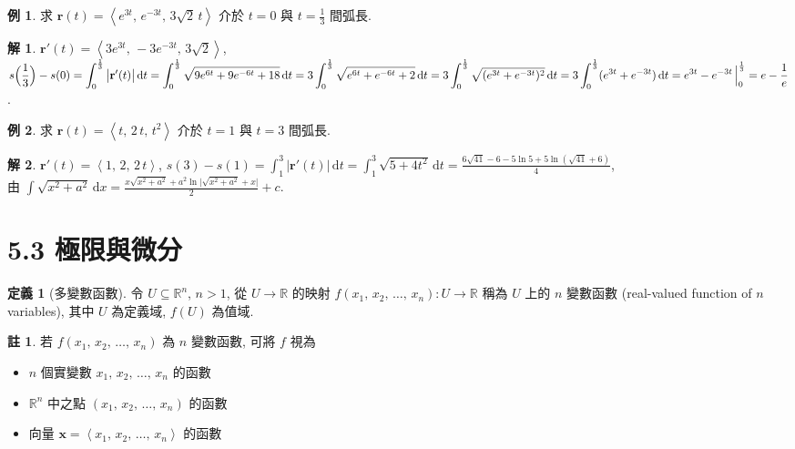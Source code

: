 \documentclass[12pt]{extarticle}
\newcommand{\ds}{\displaystyle}
\newcommand{\llt}{\left\langle}
\newcommand{\rgt}{\right\rangle}
\theoremstyle{definition}
\newtheorem*{dfn}{定義}
\newtheorem*{ex}{例}
\newtheorem*{sol}{解}
\newtheorem*{rmk}{註}
\newcommand{\vr}{\mathbf{r}}
\newcommand{\vx}{\mathbf{x}}
\newcommand{\dee}[1]{\mathrm{d}#1}
\begin{document}
\begin{ex}
  求 $\ds\vr(t) = \llt e^{3t},\,e^{-3t},\,3\sqrt{2}\,t\rgt$ 介於 $t = 0$ 與 $\ds t = \frac{1}{3}$ 間弧長. 
\end{ex}
\begin{sol}
  $\ds\vr'(t) = \llt 3e^{3t},\,-3e^{-3t},\,3\sqrt{2}\rgt$, $\ds s\Big(\frac{1}{3}\Big) - s(0) = \int_0^{\frac{1}{3}}\big|\vr'(t)\big|\,\dee{t} = \int_0^{\frac{1}{3}}\sqrt{9e^{6t} + 9e^{-6t} + 18}\,\dee{t} = 3\int_0^{\frac{1}{3}}\sqrt{e^{6t} + e^{-6t} + 2}\,\dee{t} \\= 3\int_0^{\frac{1}{3}}\sqrt{(e^{3t} + e^{-3t})^2}\,\dee{t} = 3\int_0^{\frac{1}{3}}(e^{3t} + e^{-3t})\,\dee{t} = e^{3t} - e^{-3t}\,\Big|_0^{\frac{1}{3}} = e - \frac{1}{e}$. 
\end{sol}

\begin{ex}
  求 $\ds\vr(t) = \llt t,\,2\,t,\,t^2\rgt$ 介於 $t = 1$ 與 $\ds t = 3$ 間弧長. 
\end{ex}
\begin{sol}
  $\ds\vr'(t) = \llt 1,\,2,\,2\,t\rgt$, $\ds s(3) - s(1) = \int_1^3\big|\vr'(t)\big|\,\dee{t} = \int_1^3\sqrt{5 + 4t^2}\,\dee{t} = \frac{6\sqrt{41} - 6 - 5\ln 5 + 5\ln(\sqrt{41} + 6)}{4}$, \\ 由 $\ds\int\!\sqrt{x^2 + a^2}\,\text{d}x = \frac{x\sqrt{x^2 + a^2} + a^2\ln\big|\sqrt{x^2 + a^2} + x\big|}{2} + c$. 
\end{sol}

\section*{5.3 極限與微分}

\begin{dfn}[多變數函數]
  令 $U\subseteq\mathbb{R}^n$, $n > 1$, 從 $U\to\mathbb{R}$ 的映射 $f(x_1,\,x_2,\,\ldots,\,x_n):U\to\mathbb{R}$ 稱為 $U$ 上的 $n$ 變數函數 (real-valued function of $n$ variables), 其中 $U$ 為定義域, $f(U)$ 為值域. 
\end{dfn}

\begin{rmk} 若 $f(x_1,\,x_2,\,\ldots,\,x_n)$ 為 $n$ 變數函數, 可將 $f$ 視為
  \begin{multicols}{2}
    \begin{itemize}\setlength{\itemsep}{0pt}
      \item $n$ 個實變數 $x_1,\,x_2,\,\ldots,\,x_n$ 的函數
      \item $\mathbb{R}^n$ 中之點 $(x_1,\,x_2,\,\ldots,\,x_n)$ 的函數
      \item 向量 $\vx = \llt x_1,\,x_2,\,\ldots,\,x_n\rgt$ 的函數
    \end{itemize}
  \end{multicols}
\end{rmk}
\end{document}

